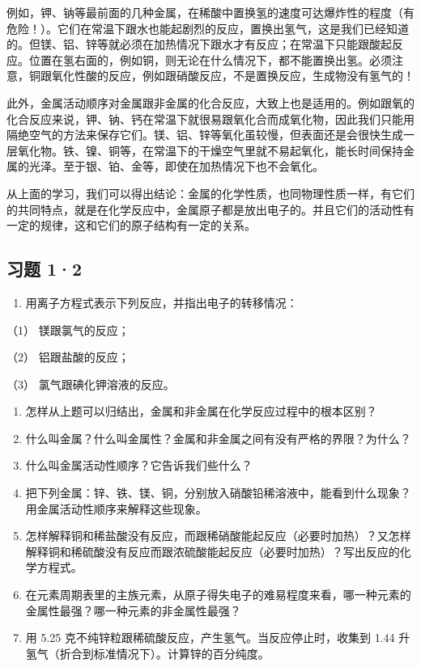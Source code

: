 例如，钾、钠等最前面的几种金属，在稀酸中置换氢的速度可达爆炸性的程度（有危险！）。它们在常温下跟水也能起剧烈的反应，置换出氢气，这是我们已经知道的。但镁、铝、锌等就必须在加热情况下跟水才有反应；在常温下只能跟酸起反应。位置在氢右面的，例如铜，则无论在什么情况下，都不能置换出氢。必须注意，铜跟氧化性酸的反应，例如跟硝酸反应，不是置换反应，生成物没有氢气的！

此外，金属活动顺序对金属跟非金属的化合反应，大致上也是适用的。例如跟氧的化合反应来说，钾、钠、钙在常温下就很易跟氧化合而成氧化物，因此我们只能用隔绝空气的方法来保存它们。镁、铝、锌等氧化虽较慢，但表面还是会很快生成一层氧化物。铁、镍、铜等，在常温下的干燥空气里就不易起氧化，能长时间保持金属的光泽。至于银、铂、金等，即使在加热情况下也不会氧化。

从上面的学习，我们可以得出结论：金属的化学性质，也同物理性质一样，有它们的共同特点，就是在化学反应中，金属原子都是放出电子的。并且它们的活动性有一定的规律，这和它们的原子结构有一定的关系。

\subsection{习题 1·2}

\begin{enumerate}
\item
  用离子方程式表示下列反应，并指出电子的转移情况：
\end{enumerate}

（1） 镁跟氯气的反应；

（2） 铝跟盐酸的反应；

（3） 氯气跟碘化钾溶液的反应。

\begin{enumerate}[start=2]
\item
  怎样从上题可以归结出，金属和非金属在化学反应过程中的根本区别？
\item
  什么叫金属？什么叫金属性？金属和非金属之间有没有严格的界限？为什么？
\item
  什么叫金属活动性顺序？它告诉我们些什么？
\item
  把下列金属：锌、铁、镁、铜，分别放入硝酸铅稀溶液中，能看到什么现象？用金属活动性顺序来解释这些现象。
\item
  怎样解释铜和稀盐酸没有反应，而跟稀硝酸能起反应（必要时加热）？又怎样解释铜和稀硫酸没有反应而跟浓硫酸能起反应（必要时加热）？写出反应的化学方程式。
\item
  在元素周期表里的主族元素，从原子得失电子的难易程度来看，哪一种元素的金属性最强？哪一种元素的非金属性最强？
\item
  用 5.25 克不纯锌粒跟稀硫酸反应，产生氢气。当反应停止时，收集到 1.44
  升氢气（折合到标准情况下）。计算锌的百分纯度。
\end{enumerate}

